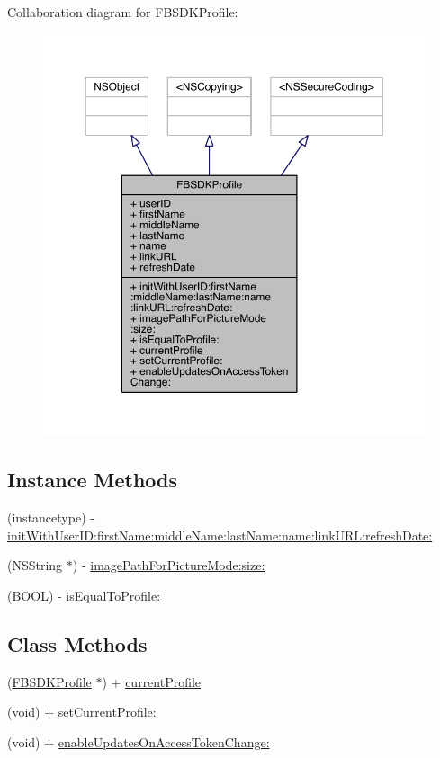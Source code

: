 Collaboration diagram for F\-B\-S\-D\-K\-Profile\-:
\nopagebreak
\begin{figure}[H]
\begin{center}
\leavevmode
\includegraphics[width=350pt]{interface_f_b_s_d_k_profile__coll__graph}
\end{center}
\end{figure}
\subsection*{Instance Methods}
\begin{DoxyCompactItemize}
\item 
(instancetype) -\/ \hyperlink{interface_f_b_s_d_k_profile_acadd65cc553c1bdf49aceb92a30556b5}{init\-With\-User\-I\-D\-:first\-Name\-:middle\-Name\-:last\-Name\-:name\-:link\-U\-R\-L\-:refresh\-Date\-:}
\item 
(N\-S\-String $\ast$) -\/ \hyperlink{interface_f_b_s_d_k_profile_a61ad2af4fd77ee66b213030c50e5279f}{image\-Path\-For\-Picture\-Mode\-:size\-:}
\item 
(B\-O\-O\-L) -\/ \hyperlink{interface_f_b_s_d_k_profile_ad33c3ef5b9f7875b25319bc5d7b2f360}{is\-Equal\-To\-Profile\-:}
\end{DoxyCompactItemize}
\subsection*{Class Methods}
\begin{DoxyCompactItemize}
\item 
(\hyperlink{interface_f_b_s_d_k_profile}{F\-B\-S\-D\-K\-Profile} $\ast$) + \hyperlink{interface_f_b_s_d_k_profile_a38bbb7b3aa2faccef349a8ecca18f78d}{current\-Profile}
\item 
(void) + \hyperlink{interface_f_b_s_d_k_profile_a68a76c246e717b3a9187316295fa1876}{set\-Current\-Profile\-:}
\item 
(void) + \hyperlink{interface_f_b_s_d_k_profile_a2464165f05f9109a0e60af7adc3a5ca8}{enable\-Updates\-On\-Access\-Token\-Change\-:}
\end{DoxyCompactItemize}
